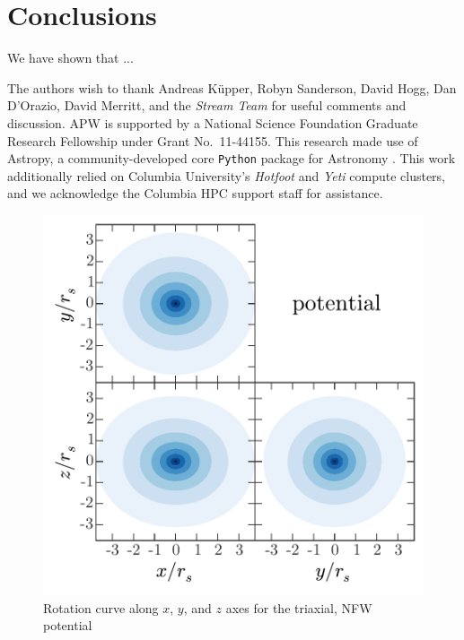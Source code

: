 \documentclass[letterpaper,12pt,preprint]{aastex}
\begin{document}
\section{Conclusions}\label{sec:conclusions}
We have shown that ...

\acknowledgements
The authors wish to thank  Andreas K\"upper, Robyn Sanderson, David Hogg, Dan D'Orazio, David Merritt, and the \emph{Stream Team} for useful comments and discussion.
APW is supported by a National Science Foundation Graduate Research Fellowship under Grant No.\ 11-44155. 
This research made use of Astropy, a community-developed core \texttt{Python} package for Astronomy \citep{astropy13}.
This work additionally relied on Columbia University's \emph{Hotfoot} and \emph{Yeti} compute clusters, and we acknowledge the Columbia HPC support staff for assistance.



\clearpage

\begin{figure}[!p]
\begin{center}
\includegraphics[width=\textwidth]{figures/potential.pdf}
\caption{Rotation curve along $x$, $y$, and $z$ axes for the triaxial, NFW potential } \label{fig:potential}
\end{center}
\end{figure}
\end{document}
